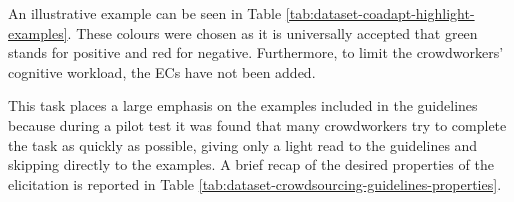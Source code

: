 An illustrative example can be seen in Table \ref{tab:dataset-coadapt-highlight-examples}. These colours were chosen as it is universally accepted that green stands for positive and red for negative. Furthermore, to limit the crowdworkers' cognitive workload, the ECs have not been added.

This task places a large emphasis on the examples included in the guidelines because during a pilot test it was found that many crowdworkers try to complete the task as quickly as possible, giving only a light read to the guidelines and skipping directly to the examples. 
A brief recap of the desired properties of the elicitation is reported in Table \ref{tab:dataset-crowdsourcing-guidelines-properties}.

